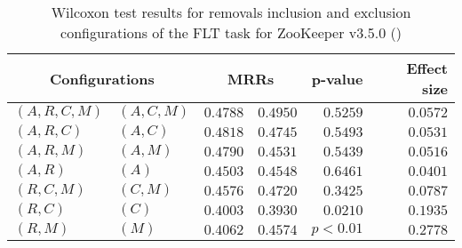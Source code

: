 
\begin{table}
\begin{spacing}{1.2}
\centering
\caption{Wilcoxon test results for removals inclusion and exclusion configurations of the FLT task for ZooKeeper v3.5.0 (\ctwo)}
\label{table:versus-wilcox-zookeeper-flt-removals}
\begin{tabular}{ll|rr|rr}
\toprule
      \multicolumn{2}{c|}{Configurations} &                \multicolumn{2}{c|}{MRRs} &             p-value & Effect size \\
\midrule
 $(A,R,C,M)$ &  $(A,C,M)$ &       $0.4788$ &  $\bm{0.4950}$ & $0.5259$ &    $0.0572$ \\
   $(A,R,C)$ &    $(A,C)$ &  $\bm{0.4818}$ &       $0.4745$ & $0.5493$ &    $0.0531$ \\
   $(A,R,M)$ &    $(A,M)$ &  $\bm{0.4790}$ &       $0.4531$ & $0.5439$ &    $0.0516$ \\
     $(A,R)$ &      $(A)$ &       $0.4503$ &  $\bm{0.4548}$ & $0.6461$ &    $0.0401$ \\
   $(R,C,M)$ &    $(C,M)$ &       $0.4576$ &  $\bm{0.4720}$ & $0.3425$ &    $0.0787$ \\
     $(R,C)$ &      $(C)$ &  $\bm{0.4003}$ &       $0.3930$ & $0.0210$ &    $0.1935$ \\
     $(R,M)$ &      $(M)$ &       $0.4062$ &  $\bm{0.4574}$ & $p<0.01$ &    $0.2778$ \\
\bottomrule
\end{tabular}

\end{spacing}
\end{table}

